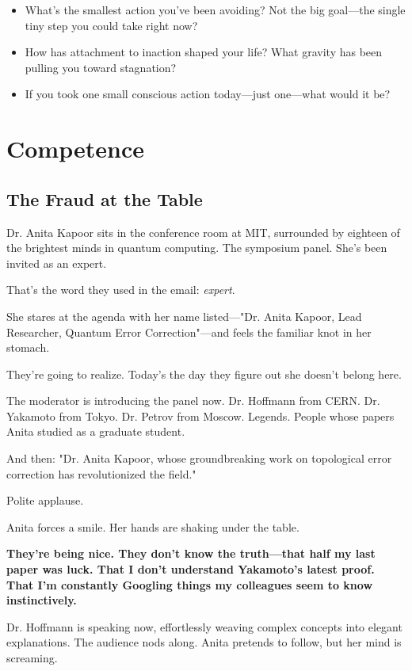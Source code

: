 \documentclass[11pt,twoside]{book}
\begin{document}
\begin{itemize}
\item What's the smallest action you've been avoiding? Not the big goal—the single tiny step you could take right now?
\item How has attachment to inaction shaped your life? What gravity has been pulling you toward stagnation?
\item If you took one small conscious action today—just one—what would it be?
\end{itemize}

\chapter{Competence}

\section*{The Fraud at the Table}

Dr. Anita Kapoor sits in the conference room at MIT, surrounded by eighteen of the brightest minds in quantum computing. The symposium panel. She's been invited as an expert.

That's the word they used in the email: \emph{expert}.

She stares at the agenda with her name listed—"Dr. Anita Kapoor, Lead Researcher, Quantum Error Correction"—and feels the familiar knot in her stomach.

They're going to realize. Today's the day they figure out she doesn't belong here.

The moderator is introducing the panel now. Dr. Hoffmann from CERN. Dr. Yakamoto from Tokyo. Dr. Petrov from Moscow. Legends. People whose papers Anita studied as a graduate student.

And then: "Dr. Anita Kapoor, whose groundbreaking work on topological error correction has revolutionized the field."

Polite applause.

Anita forces a smile. Her hands are shaking under the table.

\textbf{They're being nice. They don't know the truth—that half my last paper was luck. That I don't understand Yakamoto's latest proof. That I'm constantly Googling things my colleagues seem to know instinctively.}

Dr. Hoffmann is speaking now, effortlessly weaving complex concepts into elegant explanations. The audience nods along. Anita pretends to follow, but her mind is screaming.
\end{document}
